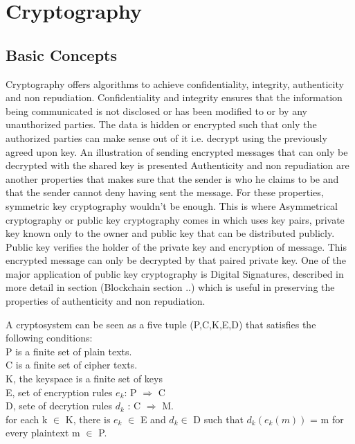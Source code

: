 \section{Cryptography}
\subsection{Basic Concepts}
Cryptography offers algorithms to achieve confidentiality, integrity, authenticity 
and non repudiation. Confidentiality and integrity ensures that the information 
being communicated is not disclosed or has been modified to or by any unauthorized 
parties. The data is hidden or encrypted such that only the authorized parties can 
make sense out of it i.e. decrypt using the previously agreed upon key. 
An illustration of 
sending encrypted messages that can only be decrypted with the shared key is presented 
Authenticity and non repudiation are another properties that makes sure that 
the sender is who he claims to be and that the sender cannot deny having sent 
the message. For these properties, symmetric key cryptography wouldn't be 
enough. This is where Asymmetrical cryptography or public key cryptography comes 
in which uses key pairs, private key known only to the owner and public key that 
can be distributed publicly. Public key verifies the holder of the private key 
and encryption of message. This encrypted message can only be decrypted by that 
paired private key. One of the major application of public key cryptography is 
Digital Signatures, described in more detail in section (Blockchain section ..) 
which is useful in preserving the properties of authenticity and non 
repudiation. 

A cryptosystem can be seen as a five tuple (P,C,K,E,D) that satisfies the following
conditions: \\ 
P is a finite set of plain texts.  \\
C is a finite set of cipher texts. \\ 
K, 	the keyspace is a finite set of keys \\
E, set of encryption rules $e_k$: P $\Rightarrow$ C \\
D, sete of decrytion rules $d_k$ : C $\Rightarrow$ M. \\
for each k $\in$ K, there is $e_{k}$ $\in$ E and $d_{k} \in$ D such that 
$d_{k}(e_{k}(m))$ = m for every plaintext m $\in$ P. \\

